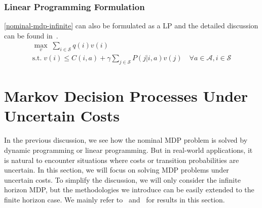 \documentclass[11pt,reqno]{amsart}
\theoremstyle{definition}
\numberwithin{equation}{section}
\theoremstyle{remark}
\begin{document}

\subsubsection{Linear Programming Formulation}
\ref{nominal-mdp-infinite} can also be formulated as a LP and the detailed discussion can be found in~\cite{puterman2014markov}.
\begin{equation}\label{lp:infinite}
    \begin{gathered}
    \max_{v} \; \sum_{i\in\mathcal{S}}q(i)v(i) \\
    \text{s.t.} \; v(i)\leq C(i,a)+\gamma\sum_{j\in\mathcal{S}}P(j|i,a)v(j)\quad\forall a\in\mathcal{A},i\in\mathcal{S}
\end{gathered}
\end{equation}



\section{Markov Decision Processes Under Uncertain Costs}
In the previous discussion, we see how the nominal MDP problem is solved by dynamic programming or linear programming. But in real-world applications, it is natural to encounter situations where costs or transition probabilities are uncertain. In this section, we will focus on solving MDP problems under uncertain costs. To simplify the discussion, we will only consider the infinite horizon MDP, but the methodologies we introduce can be easily extended to the finite horizon case. We mainly refer to~\cite{delage2010percentile} and~\cite{xu2010distributionally} for results in this section.

\end{document}
